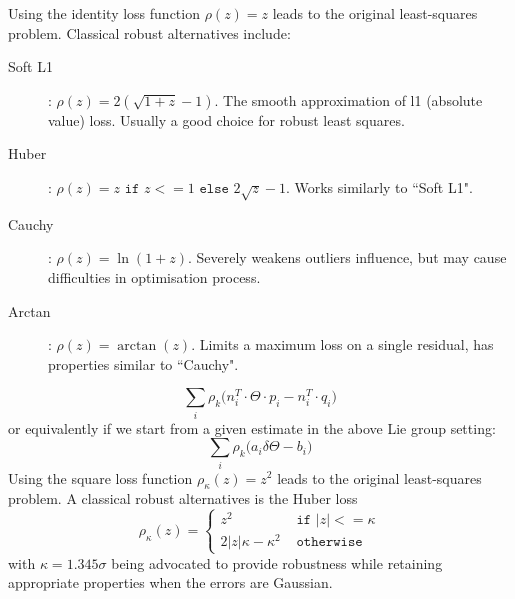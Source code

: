 Using the identity loss function $\rho(z)=z$ leads to the original least-squares problem. Classical robust alternatives include:
\begin{description}
  \item[Soft L1]:
  $\rho(z) = 2 (\sqrt{1 + z} - 1)$.
  The smooth approximation of l1 (absolute value) loss. Usually a good choice for robust least squares.

  \item[Huber]:
  $\rho(z) = z \texttt{ if } z <= 1 \texttt{ else } 2\sqrt{z} - 1$.
  Works similarly to ``Soft L1".

  \item[Cauchy]:
  $\rho(z) = \ln(1 + z)$.
  Severely weakens outliers influence, but may cause difficulties in optimisation process.

   \item[Arctan]:
   $\rho(z) = \arctan(z)$.
   Limits a maximum loss on a single residual, has properties similar to ``Cauchy".
\end{description}
\fi
\begin{equation}
\sum_i \rho_k\Big(n_i^T \cdot \Theta \cdot p_i - n_i^T \cdot q_i\Big)
\end{equation}
or equivalently if we start from a given estimate in the above Lie group setting:
\begin{equation}
\sum_i \rho_k\Big(a_i \delta\Theta - b_i\Big)
\end{equation}
%
Using the square loss function $\rho_\kappa(z)=z^2$ leads to the original least-squares problem. A classical robust alternatives is the Huber loss
\begin{equation}
\rho_\kappa(z) =
\begin{cases}
  z^2 &\texttt{ if } |z| <= \kappa \\
  2|z|\kappa - \kappa^2  &\texttt{ otherwise }
\end{cases}
\end{equation}
with $\kappa=1.345\sigma$ being advocated to provide robustness while retaining appropriate properties when the errors are Gaussian.

